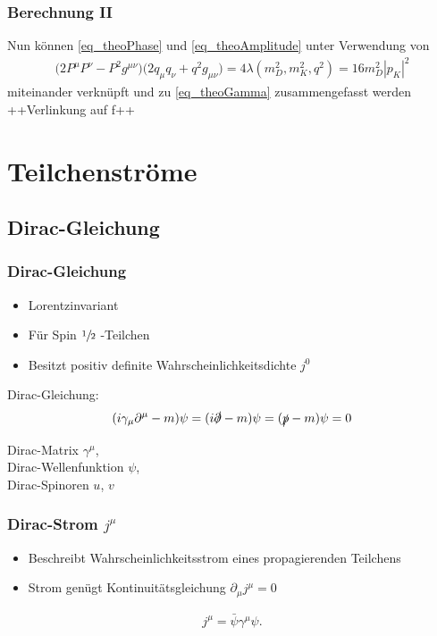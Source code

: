 \documentclass[hyperref={pdfpagelabels=false}]{beamer}
\begin{document}
\begin{frame}
\frametitle{Berechnung II}
 Nun k\"onnen \eqref{eq_theoPhase} und \eqref{eq_theoAmplitude} unter Verwendung von
 \begin{align*}
 \big(2P^\mu P^\nu - P^2 g^{\mu\nu}\big)\big(2q_\mu q_\nu + q^2g_{\mu\nu}) = 4 \lambda(m_D^2,m_K^2,q^2) = 16 m_D^2 |p_K|^2
 \end{align*}
 miteinander verkn\"upft und zu \eqref{eq_theoGamma} zusammengefasst werden
 ++Verlinkung auf f++

\end{frame}




\section{Teilchenstr\"ome}
\begin{frame}
\tableofcontents[currentsection]
\end{frame}

\subsection{Dirac-Gleichung}
\begin{frame}
\frametitle{Dirac-Gleichung}
\begin{itemize}
 \item Lorentzinvariant
 \item Für Spin $\sfrac12$ -Teilchen
 \item Besitzt positiv definite Wahrscheinlichkeitsdichte $j^0$
\end{itemize}
Dirac-Gleichung:
\begin{align}
 (i\gamma_\mu\partial^\mu-m)\psi = (i\slashed{\partial}-m)\psi=(\slashed{p}-m)\psi = 0
 \label{eq_dirac}
\end{align}
\vspace{0.5cm}

Dirac-Matrix $\gamma^\mu$,\\
Dirac-Wellenfunktion $\psi$,\\
Dirac-Spinoren $u$, $v$
\end{frame}

\begin{frame}
 \frametitle{Dirac-Strom $j^\mu$}
 \begin{itemize}
  \item Beschreibt Wahrscheinlichkeitsstrom eines propagierenden Teilchens
  \item Strom genügt Kontinuitätsgleichung $\partial_\mu j^\mu = 0$
 \end{itemize}

 \begin{align*}
  j^\mu = \bar \psi \gamma^\mu \psi. 
 \end{align*}

\end{frame}
\end{document}
